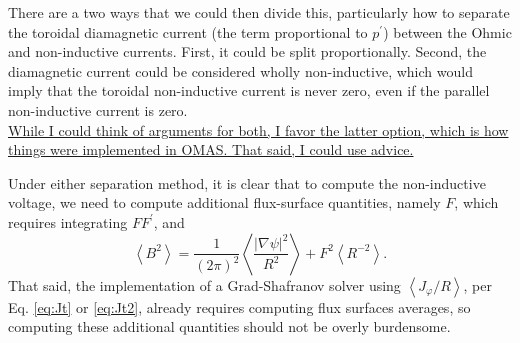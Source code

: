 \documentclass[reprint,onecolumn,amsmath,aip,pop,letterpaper, 11pt]{revtex4-1}
\newcommand{\Jt}{J_\varphi}
\newcommand{\fsa}[1]{\left\langle #1 \right\rangle}
\begin{document}
There are a two ways that we could then divide this, particularly how to separate the toroidal diamagnetic current (the term proportional to $p^\prime$) between the Ohmic and non-inductive currents. First, it could be split proportionally.  Second, the diamagnetic current could be considered wholly non-inductive, which would imply that the toroidal non-inductive current is never zero, even if the parallel non-inductive current is zero. \\
{\color{Red} \ul{While I could think of arguments for both,  I favor the latter option, which is how things were implemented in OMAS. That said, I could use advice.}}

Under either separation method, it is clear that to compute the non-inductive voltage, we need to compute additional flux-surface quantities, namely $F$, which requires integrating $FF^\prime$, and
\begin{equation}
\fsa{B^2} = \frac{1}{(2\pi)^2} \fsa{\frac{\left|\nabla\psi\right|^2}{R^2}} + F^2\fsa{R^{-2}}.\label{eq:B2}
\end{equation}
That said,  the implementation of a Grad-Shafranov solver using $\fsa{\Jt/R}$, per Eq. \ref{eq:Jt} or \ref{eq:Jt2}, already requires computing flux surfaces averages, so computing these additional quantities should not be overly burdensome.


\end{document}
